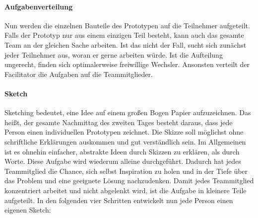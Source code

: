 \paragraph{Aufgabenverteilung}
Nun werden die einzelnen Bauteile des Prototypen auf die Teilnehmer aufgeteilt. Falls der Prototyp nur aus einem einzigen Teil besteht, kann auch das gesamte Team an der gleichen Sache arbeiten. Ist das nicht der Fall, sucht sich zunächst jeder Teilnehmer aus, woran er gerne arbeiten würde. Ist die Aufteilung ungerecht, finden sich optimalerweise freiwillige Wechsler. Ansonsten verteilt der Facilitator die Aufgaben auf die Teammitglieder.

\paragraph{Sketch}
Sketching bedeutet, eine Idee auf einem großen Bogen Papier aufzuzeichnen. Das heißt, der gesamte Nachmittag des zweiten Tages besteht daraus, dass jede Person einen individuellen Prototypen zeichnet. Die Skizze soll möglichst ohne schriftliche Erklärungen auskommen und gut verständlich sein. Im Allgemeinen ist es ohnehin einfacher, abstrakte Ideen durch Skizzen zu erklären, als durch Worte. Diese Aufgabe wird wiederum alleine durchgeführt. Dadurch hat jedes Teammitglied die Chance, sich selbst Inspiration zu holen und in der Tiefe über das Problem und eine geeignete Lösung nachzudenken. Damit jedes Teammitglied konzentriert arbeitet und nicht abgelenkt wird, ist die Aufgabe in kleinere Teile aufgeteilt. In den folgenden vier Schritten entwickelt nun jede Person einen eigenen Sketch:
